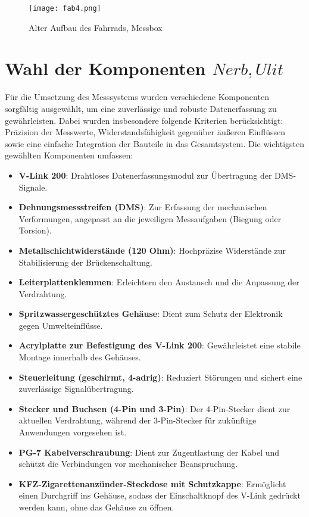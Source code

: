 \begin{figure}[htbp]
    \begin{center}
        \texttt{[image: fab4.png]}
        \caption[Alter Aufbau des Fahrrads, Messbox (Abbildungsverzeichnis)]{Alter Aufbau des Fahrrads, Messbox}
        
        \label{fig:fab4}
    \end{center}
\end{figure}


\newpage
\section{Wahl der Komponenten \(Nerb, Ulit\)}
Für die Umsetzung des Messsystems wurden verschiedene Komponenten sorgfältig ausgewählt, um eine zuverlässige und robuste Datenerfassung zu gewährleisten. Dabei wurden insbesondere folgende Kriterien berücksichtigt: Präzision der Messwerte, Widerstandsfähigkeit gegenüber äußeren Einflüssen sowie eine einfache Integration der Bauteile in das Gesamtsystem.
Die wichtigsten gewählten Komponenten umfassen:
\begin{itemize}
    \item \textbf{V-Link 200}: Drahtloses Datenerfassungsmodul zur Übertragung der DMS-Signale.
    \item \textbf{Dehnungsmessstreifen (DMS)}: Zur Erfassung der mechanischen Verformungen, angepasst an die jeweiligen Messaufgaben (Biegung oder Torsion).
    \item \textbf{Metallschichtwiderstände (120 Ohm)}: Hochpräzise Widerstände zur Stabilisierung der Brückenschaltung.
    \item \textbf{Leiterplattenklemmen}: Erleichtern den Austausch und die Anpassung der Verdrahtung.
    \item \textbf{Spritzwassergeschütztes Gehäuse}: Dient zum Schutz der Elektronik gegen Umwelteinflüsse.
    \item \textbf{Acrylplatte zur Befestigung des V-Link 200}: Gewährleistet eine stabile Montage innerhalb des Gehäuses.
    \item \textbf{Steuerleitung (geschirmt, 4-adrig)}: Reduziert Störungen und sichert eine zuverlässige Signalübertragung.
    \item \textbf{Stecker und Buchsen (4-Pin und 3-Pin)}: Der 4-Pin-Stecker dient zur aktuellen Verdrahtung, während der 3-Pin-Stecker für zukünftige Anwendungen vorgesehen ist.
    \item \textbf{PG-7 Kabelverschraubung}: Dient zur Zugentlastung der Kabel und schützt die Verbindungen vor mechanischer Beanspruchung.
    \item \textbf{KFZ-Zigarettenanzünder-Steckdose mit Schutzkappe}: Ermöglicht einen Durchgriff ins Gehäuse, sodass der Einschaltknopf des V-Link gedrückt werden kann, ohne das Gehäuse zu öffnen.
\end{itemize}


